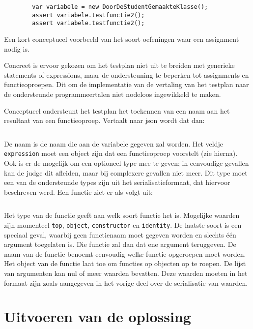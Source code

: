 \begin{listing}
    \begin{verbatim}
        var variabele = new DoorDeStudentGemaakteKlasse();
        assert variabele.testfunctie2();
        assert variabele.testfunctie2();
    \end{verbatim}
    \caption{Een kort conceptueel voorbeeld van het soort oefeningen waar een assignment nodig is.}
    \label{lst:assignment-example}
\end{listing}

Concreet is ervoor gekozen om het testplan niet uit te breiden met generieke statements of expressions, maar de ondersteuning te beperken tot assignments en functieoproepen.
Dit om de implementatie van de vertaling van het testplan naar de ondersteunde programmeertalen niet nodeloos ingewikkeld te maken.

Conceptueel ondersteunt het testplan het toekennen van een naam aan het resultaat van een functieoproep.
Vertaalt naar json wordt dat dan:

\inputminted{json}{code/assignment.json}

De naam is de naam die aan de variabele gegeven zal worden.
Het veldje \texttt{expression} moet een object zijn dat een functieoproep voorstelt (zie hierna).
Ook is er de mogelijk om een optioneel type mee te geven;
in eenvoudige gevallen kan de judge dit afleiden, maar bij complexere gevallen niet meer.
Dit type moet een van de ondersteunde types zijn uit het serialisatieformaat, dat hiervoor beschreven werd.
Een functie ziet er als volgt uit:

\inputminted{json}{code/function.json}

Het type van de functie geeft aan welk soort functie het is.
Mogelijke waarden zijn momenteel \texttt{top}, \texttt{object}, \texttt{constructor} en \texttt{identity}.
De laatste soort is een speciaal geval, waarbij geen functienaam moet gegeven worden en slechts één argument toegelaten is.
Die functie zal dan dat ene argument teruggeven.
De naam van de functie benoemt eenvoudig welke functie opgeroepen moet worden.
Het object van de functie laat toe om functies op objecten op te roepen.
De lijst van argumenten kan nul of meer waarden bevatten.
Deze waarden moeten in het formaat zijn zoals aangegeven in het vorige deel over de serialisatie van waarden.


\section{Uitvoeren van de oplossing}\label{sec:uitvoeren-van-de-oplossing}

